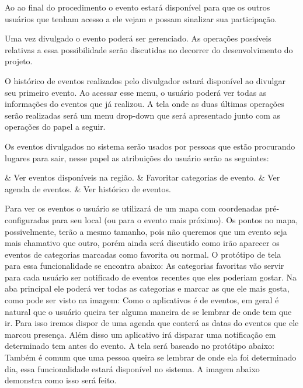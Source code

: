\documentclass{article}
\begin{document}
	\bigskip
	Ao ao final do procedimento o evento estará disponível para que os outros usuários que tenham acesso a ele vejam e possam sinalizar sua participação.  
	
	Uma vez divulgado o evento poderá ser gerenciado. As operações possíveis relativas a essa possibilidade serão discutidas no decorrer do desenvolvimento do projeto.  
	
	O histórico de eventos realizados pelo divulgador estará disponível ao divulgar seu primeiro evento. Ao acessar esse menu, o usuário poderá ver todas as informações do eventos que já realizou. A tela onde as duas últimas operações serão realizadas será um menu drop-down que será apresentado junto com as operações do papel a seguir.
	
	Os eventos divulgados no sistema serão usados por pessoas que estão procurando lugares para sair, nesse papel as atribuições do usuário serão as seguintes:\medskip
	\begin{easylist}[itemize]
	& Ver eventos disponíveis na região.
	& Favoritar categorias de evento.
	& Ver agenda de eventos.
	& Ver histórico de eventos.
	\end{easylist}\medskip
	
	Para ver os eventos o usuário se utilizará de um mapa com coordenadas pré-configuradas para seu local (ou para o evento mais próximo). Os pontos no mapa, possivelmente, terão a mesmo tamanho, pois não queremos que um evento seja mais chamativo que outro, porém ainda será discutido como irão aparecer os eventos de categorias marcadas como favorita ou normal. O protótipo de tela para essa funcionalidade se encontra abaixo:
	As categorias favoritas vão servir para cada usuário ser notificado de eventos recentes que eles poderiam gostar. Na aba principal ele poderá ver todas as categorias e marcar as que ele mais gosta, como pode ser visto na imagem: 
	Como o aplicativos é de eventos, em geral é natural que o usuário queira ter alguma maneira de se lembrar de onde tem que ir. Para isso iremos dispor de uma agenda que conterá as datas do eventos que ele marcou presença. Além disso um aplicativo irá disparar uma notificação em determinado tem antes do evento. A tela será baseado no protótipo abaixo:
	Também é comum que uma pessoa queira se lembrar de onde ela foi determinado dia, essa funcionalidade estará disponível no sistema. A imagem abaixo demonstra como isso será feito.
	 
\end{document}

